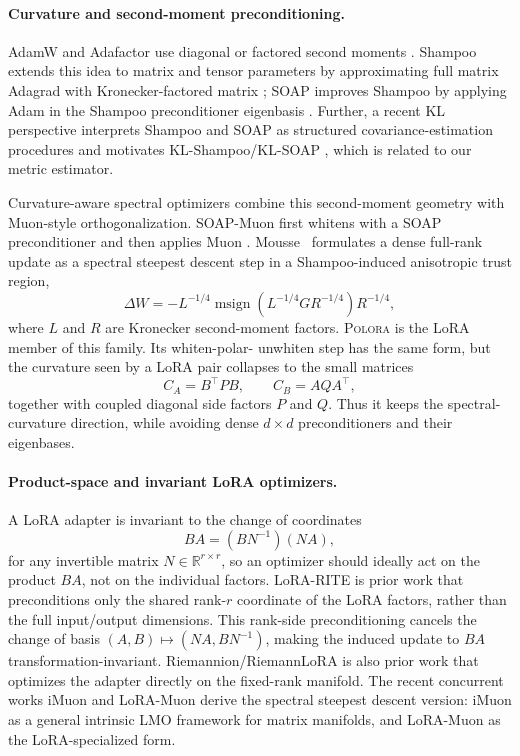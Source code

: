 \documentclass[11pt]{article}
\DeclareMathOperator{\polar}{msign}          %
\newcommand{\methodname}{\textsc{Polora}\xspace}
\theoremstyle{plain}
\theoremstyle{definition}
\theoremstyle{remark}
\begin{document}
\paragraph{Curvature and second-moment preconditioning.}
AdamW and Adafactor use diagonal or factored second moments
\cite{adamw,adafactor}.  Shampoo extends this idea to matrix and tensor
parameters by approximating full matrix Adagrad with Kronecker-factored
matrix
\cite{shampoo}; SOAP improves Shampoo by applying Adam in the
Shampoo preconditioner eigenbasis \cite{soap}.  
Further, a recent KL perspective
interprets Shampoo and SOAP as structured covariance-estimation
procedures and motivates KL-Shampoo/KL-SOAP \cite{klshampoo}, which is
related to our metric estimator.

Curvature-aware spectral optimizers combine this second-moment geometry
with Muon-style orthogonalization.  SOAP-Muon first whitens with a SOAP
preconditioner and then applies Muon \cite{soapmuon}.  Mousse~ \cite{mousse} formulates
a dense full-rank update as a spectral steepest descent step in a
Shampoo-induced anisotropic trust region,
\[
    \Delta W
    =
    -L^{-1/4}
      \polar\left(L^{-1/4} G R^{-1/4}\right)
      R^{-1/4},
\]
where $L$ and $R$ are Kronecker second-moment factors.
\methodname{} is the LoRA member of this family.  Its whiten-polar-
unwhiten step has the same form, but the curvature seen by a LoRA pair
collapses to the small matrices
\[
    C_A=B^\top P B,\qquad C_B=AQA^\top ,
\]
together with coupled diagonal side factors $P$ and $Q$.  Thus it keeps the
spectral-curvature direction, while avoiding dense $d\times d$
preconditioners and their eigenbases.




\paragraph{Product-space and invariant LoRA optimizers.}
A LoRA adapter is invariant to the change of coordinates
\[
    BA=(BN^{-1})(NA),
\]
for any invertible matrix $N\in \mathbb{R}^{r\times r}$,
so an optimizer should ideally act on the product $BA$, not on the
individual factors.  
LoRA-RITE \cite{lorarite} is prior work that preconditions only the
shared rank-$r$ coordinate of the LoRA factors, rather than the full
input/output dimensions.  This rank-side preconditioning cancels the
change of basis $(A,B)\mapsto(NA,BN^{-1})$, making the induced update to
$BA$ transformation-invariant.
Riemannion/RiemannLoRA \cite{riemannion} is also prior work
that optimizes the adapter directly on the fixed-rank manifold.  The
recent concurrent works iMuon \cite{imuon} and LoRA-Muon
\cite{loramuon} derive the spectral steepest descent version: iMuon as a
general intrinsic LMO framework for matrix manifolds, and LoRA-Muon as
the LoRA-specialized form.
\end{document}
